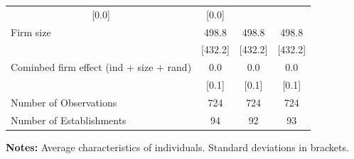 \documentclass{article}
\begin{document}
\begin{table}[htbp]
\begin{threeparttable}
\begin{tabular}{llll}
  \multicolumn{1}{c}{[0.0]} &
  \multicolumn{1}{c}{[0.0]} \\
\multicolumn{1}{l}{Firm size} &
  \multicolumn{1}{c}{498.8} &
  \multicolumn{1}{c}{498.8} &
  \multicolumn{1}{c}{498.8} \\
\multicolumn{1}{l}{} &
  \multicolumn{1}{c}{[432.2]} &
  \multicolumn{1}{c}{[432.2]} &
  \multicolumn{1}{c}{[432.2]} \\
\multicolumn{1}{l}{Cominbed firm effect (ind + size + rand)} &
  \multicolumn{1}{c}{0.0} &
  \multicolumn{1}{c}{0.0} &
  \multicolumn{1}{c}{0.0} \\
\multicolumn{1}{l}{} &
  \multicolumn{1}{c}{[0.1]} &
  \multicolumn{1}{c}{[0.1]} &
  \multicolumn{1}{c}{[0.1]} \\
\midrule
\multicolumn{1}{l}{Number of Observations} &
  \multicolumn{1}{c}{724} &
  \multicolumn{1}{c}{724} &
  \multicolumn{1}{c}{724} \\
\multicolumn{1}{l}{Number of Establishments} &
  \multicolumn{1}{c}{94} &
  \multicolumn{1}{c}{92} &
  \multicolumn{1}{c}{93} \\
\bottomrule
\end{tabular}

 \footnotesize  
\textbf{Notes:} Average characteristics of individuals. Standard deviations in brackets. 
\end{threeparttable} 
\end{table}
\end{document}
